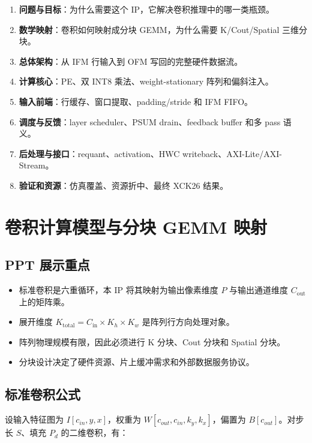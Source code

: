 \documentclass[fontset=fandol,ugly,language=chinese]{pkuthss}
\newcommand{\KTOTAL}{K_{\mathrm{total}}}
\newcommand{\COUT}{C_{\mathrm{out}}}
\newcommand{\CIN}{C_{\mathrm{in}}}
\begin{document}
\begin{enumerate}
    \item \textbf{问题与目标}：为什么需要这个 IP，它解决卷积推理中的哪一类瓶颈。
    \item \textbf{数学映射}：卷积如何映射成分块 GEMM，为什么需要 K/Cout/Spatial 三维分块。
    \item \textbf{总体架构}：从 IFM 行输入到 OFM 写回的完整硬件数据流。
    \item \textbf{计算核心}：PE、双 INT8 乘法、weight-stationary 阵列和偏斜注入。
    \item \textbf{输入前端}：行缓存、窗口提取、padding/stride 和 IFM FIFO。
    \item \textbf{调度与反馈}：layer scheduler、PSUM drain、feedback buffer 和多 pass 语义。
    \item \textbf{后处理与接口}：requant、activation、HWC writeback、AXI-Lite/AXI-Stream。
    \item \textbf{验证和资源}：仿真覆盖、资源折中、最终 XCK26 结果。
\end{enumerate}

\chapter{卷积计算模型与分块 GEMM 映射}

\section{PPT 展示重点}

\begin{itemize}
    \item 标准卷积是六重循环，本 IP 将其映射为输出像素维度 $P$ 与输出通道维度 $\COUT$ 上的矩阵乘。
    \item 展开维度 $\KTOTAL=\CIN \times K_h \times K_w$ 是阵列行方向处理对象。
    \item 阵列物理规模有限，因此必须进行 K 分块、Cout 分块和 Spatial 分块。
    \item 分块设计决定了硬件资源、片上缓冲需求和外部数据服务协议。
\end{itemize}

\section{标准卷积公式}

设输入特征图为 $I[c_{in},y,x]$，权重为 $W[c_{out},c_{in},k_y,k_x]$，偏置为 $B[c_{out}]$。对步长 $S$、填充 $P_d$ 的二维卷积，有：
\end{document}
